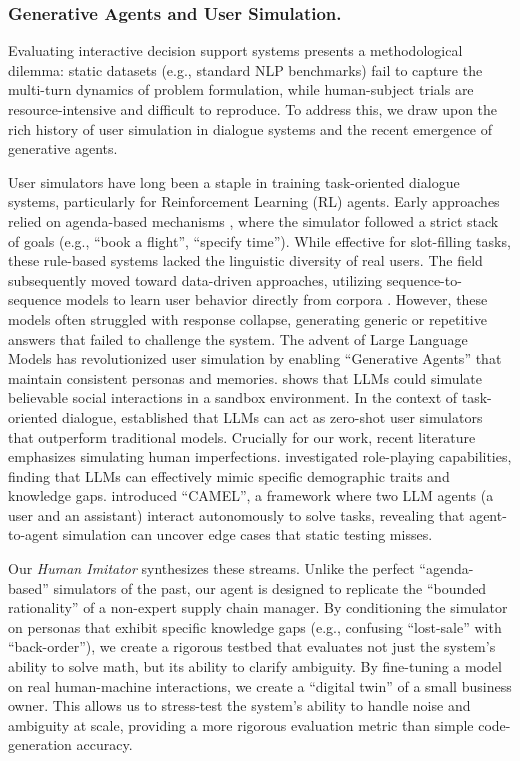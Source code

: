 \subsubsection{Generative Agents and User Simulation.}
Evaluating interactive decision support systems presents a methodological dilemma: static datasets (e.g., standard NLP benchmarks) fail to capture the multi-turn dynamics of problem formulation, while human-subject trials are resource-intensive and difficult to reproduce. To address this, we draw upon the rich history of user simulation in dialogue systems and the recent emergence of generative agents.

User simulators have long been a staple in training task-oriented dialogue systems, particularly for Reinforcement Learning (RL) agents. Early approaches relied on agenda-based mechanisms \citep{schatzmann2007agenda}, where the simulator followed a strict stack of goals (e.g., ``book a flight'', ``specify time''). While effective for slot-filling tasks, these rule-based systems lacked the linguistic diversity of real users. The field subsequently moved toward data-driven approaches, utilizing sequence-to-sequence models to learn user behavior directly from corpora \citep{kreyssig2018neural, shi2019build}. However, these models often struggled with response collapse, generating generic or repetitive answers that failed to challenge the system.
The advent of Large Language Models has revolutionized user simulation by enabling ``Generative Agents'' that maintain consistent personas and memories. \cite{park2023generative} shows that LLMs could simulate believable social interactions in a sandbox environment. In the context of task-oriented dialogue, \cite{wang2025user} established that LLMs can act as zero-shot user simulators that outperform traditional models.
Crucially for our work, recent literature emphasizes simulating human imperfections. \cite{wang2024incharacter} investigated role-playing capabilities, finding that LLMs can effectively mimic specific demographic traits and knowledge gaps. \cite{li2023camel} introduced ``CAMEL'', a framework where two LLM agents (a user and an assistant) interact autonomously to solve tasks, revealing that agent-to-agent simulation can uncover edge cases that static testing misses.

Our \emph{Human Imitator} synthesizes these streams. Unlike the perfect ``agenda-based'' simulators of the past, our agent is designed to replicate the ``bounded rationality'' \citep{simon1955behavioral} of a non-expert supply chain manager. By conditioning the simulator on personas that exhibit specific knowledge gaps (e.g., confusing ``lost-sale'' with ``back-order''), we create a rigorous testbed that evaluates not just the system's ability to solve math, but its ability to clarify ambiguity. By fine-tuning a model on real human-machine interactions, we create a ``digital twin'' of a small business owner. This allows us to stress-test the system's ability to handle noise and ambiguity at scale, providing a more rigorous evaluation metric than simple code-generation accuracy.